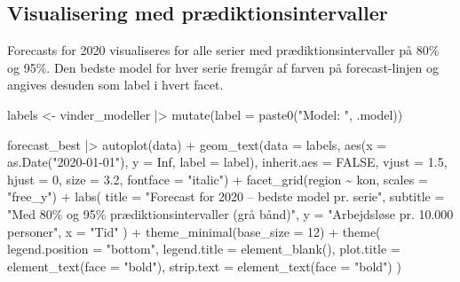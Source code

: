 \documentclass[
]{article}
\newenvironment{Shaded}{\begin{snugshade}}{\end{snugshade}}
\newcommand{\AttributeTok}[1]{\textcolor[rgb]{0.40,0.45,0.13}{#1}}
\newcommand{\ConstantTok}[1]{\textcolor[rgb]{0.56,0.35,0.01}{#1}}
\newcommand{\DecValTok}[1]{\textcolor[rgb]{0.68,0.00,0.00}{#1}}
\newcommand{\FloatTok}[1]{\textcolor[rgb]{0.68,0.00,0.00}{#1}}
\newcommand{\FunctionTok}[1]{\textcolor[rgb]{0.28,0.35,0.67}{#1}}
\newcommand{\NormalTok}[1]{\textcolor[rgb]{0.00,0.23,0.31}{#1}}
\newcommand{\OtherTok}[1]{\textcolor[rgb]{0.00,0.23,0.31}{#1}}
\newcommand{\SpecialCharTok}[1]{\textcolor[rgb]{0.37,0.37,0.37}{#1}}
\newcommand{\StringTok}[1]{\textcolor[rgb]{0.13,0.47,0.30}{#1}}
\begin{document}
\subsection{Visualisering med
prædiktionsintervaller}\label{visualisering-med-pruxe6diktionsintervaller}

Forecasts for 2020 visualiseres for alle serier med
prædiktionsintervaller på 80\% og 95\%. Den bedste model for hver serie
fremgår af farven på forecast-linjen og angives desuden som label i
hvert facet.

\begin{Shaded}
\begin{Highlighting}[]
\NormalTok{labels }\OtherTok{\textless{}{-}}\NormalTok{ vinder\_modeller }\SpecialCharTok{|\textgreater{}} 
  \FunctionTok{mutate}\NormalTok{(}\AttributeTok{label =} \FunctionTok{paste0}\NormalTok{(}\StringTok{"Model: "}\NormalTok{, .model))}

\NormalTok{forecast\_best }\SpecialCharTok{|\textgreater{}} 
  \FunctionTok{autoplot}\NormalTok{(data) }\SpecialCharTok{+}
  \FunctionTok{geom\_text}\NormalTok{(}\AttributeTok{data =}\NormalTok{ labels,}
            \FunctionTok{aes}\NormalTok{(}\AttributeTok{x =} \FunctionTok{as.Date}\NormalTok{(}\StringTok{"2020{-}01{-}01"}\NormalTok{), }\AttributeTok{y =} \ConstantTok{Inf}\NormalTok{, }\AttributeTok{label =}\NormalTok{ label),}
            \AttributeTok{inherit.aes =} \ConstantTok{FALSE}\NormalTok{,}
            \AttributeTok{vjust =} \FloatTok{1.5}\NormalTok{, }\AttributeTok{hjust =} \DecValTok{0}\NormalTok{, }\AttributeTok{size =} \FloatTok{3.2}\NormalTok{, }\AttributeTok{fontface =} \StringTok{"italic"}\NormalTok{) }\SpecialCharTok{+}
  \FunctionTok{facet\_grid}\NormalTok{(region }\SpecialCharTok{\textasciitilde{}}\NormalTok{ kon, }\AttributeTok{scales =} \StringTok{"free\_y"}\NormalTok{) }\SpecialCharTok{+}
  \FunctionTok{labs}\NormalTok{(}
    \AttributeTok{title =} \StringTok{"Forecast for 2020 – bedste model pr. serie"}\NormalTok{,}
    \AttributeTok{subtitle =} \StringTok{"Med 80\% og 95\% prædiktionsintervaller (grå bånd)"}\NormalTok{,}
    \AttributeTok{y =} \StringTok{"Arbejdsløse pr. 10.000 personer"}\NormalTok{, }
    \AttributeTok{x =} \StringTok{"Tid"}
\NormalTok{  ) }\SpecialCharTok{+}
  \FunctionTok{theme\_minimal}\NormalTok{(}\AttributeTok{base\_size =} \DecValTok{12}\NormalTok{) }\SpecialCharTok{+}
  \FunctionTok{theme}\NormalTok{(}
    \AttributeTok{legend.position =} \StringTok{"bottom"}\NormalTok{,}
    \AttributeTok{legend.title =} \FunctionTok{element\_blank}\NormalTok{(),}
    \AttributeTok{plot.title =} \FunctionTok{element\_text}\NormalTok{(}\AttributeTok{face =} \StringTok{"bold"}\NormalTok{),}
    \AttributeTok{strip.text =} \FunctionTok{element\_text}\NormalTok{(}\AttributeTok{face =} \StringTok{"bold"}\NormalTok{)}
\NormalTok{  )}
\end{Highlighting}
\end{Shaded}
\end{document}
